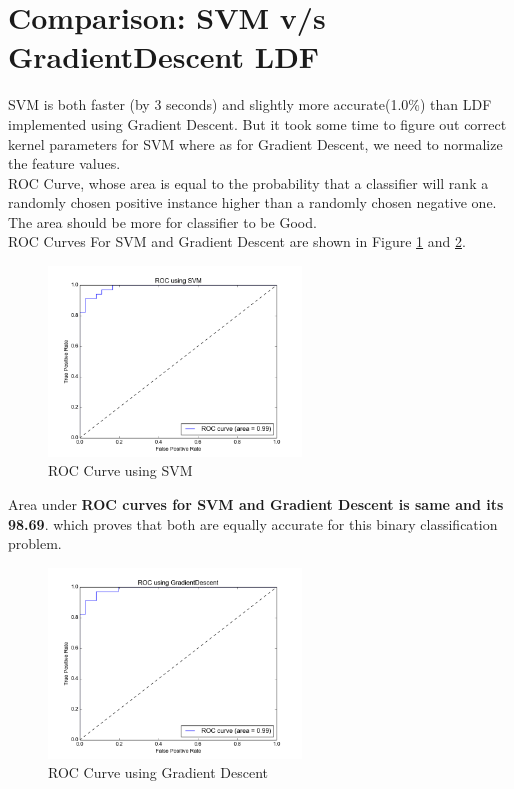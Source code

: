 \documentclass[11pt, pdftex]{article}
\begin{document}
\section{Comparison: SVM v/s GradientDescent LDF}
SVM is both faster (by 3 seconds) and slightly more accurate(1.0\%) than LDF implemented using Gradient Descent. But it took some time to figure out correct kernel parameters for SVM where as for Gradient Descent, we need to normalize the feature values.\\
ROC Curve, whose area is equal to the probability that a classifier will rank a randomly chosen positive instance higher than a randomly chosen negative one. The area should be more for classifier to be Good.\\
ROC Curves For SVM and Gradient Descent are shown in Figure \ref{fig:rocsvm} and \ref{fig:rocgd}.\\
\begin{figure}
    \centering
    \includegraphics[width=0.6\textwidth]{pics/ROCSVM.png} 
    \caption{ROC Curve using SVM}
    \label{fig:rocsvm}
\end{figure}
Area under {\bf ROC curves for SVM and Gradient Descent is same and its 98.69}. which proves that both are equally accurate for this binary classification problem.
\begin{figure}
    \centering
    \includegraphics[width=0.6\textwidth]{pics/ROCGD.png} 
    \caption{ROC Curve using Gradient Descent}
    \label{fig:rocgd}
\end{figure}
\end{document}
